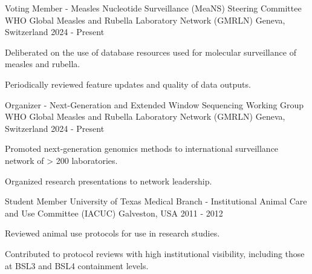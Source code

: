 

\begin{cventries}
  \vspace{-4.0mm}
  \cventry
    {Voting Member - Measles Nucleotide Surveillance (MeaNS) Steering Committee} %
    {WHO Global Measles and Rubella Laboratory Network (GMRLN)} %
    {Geneva, Switzerland} %
    {2024 - Present} %
    {
      \begin{cvitems} %
        \item {Deliberated on the use of database resources used for molecular surveillance of measles and rubella.}
        \item {Periodically reviewed feature updates and quality of data outputs.}
      \end{cvitems}
    } 
  \vspace{2.0mm}
  \cventry
    {Organizer - Next-Generation and Extended Window Sequencing Working Group} %
    {WHO Global Measles and Rubella Laboratory Network (GMRLN)} %
    {Geneva, Switzerland} %
    {2024 - Present} %
    {
      \begin{cvitems} %
        \item {Promoted next-generation genomics methods to international surveillance network of > 200 laboratories.}
        \item {Organized research presentations to network leadership.}
      \end{cvitems}
    } 
    
  \vspace{2.0mm}
  \cventry
    {Student Member} %
    {University of Texas Medical Branch - Institutional Animal Care and Use Committee (IACUC)} %
    {Galveston, USA} %
    {2011 - 2012} %
    {
     \begin{cvitems} %
        \item {Reviewed animal use protocols for use in research studies.}
        \item {Contributed to protocol reviews with high institutional visibility, including those at BSL3 and BSL4 containment levels.}
      \end{cvitems}
    }
\end{cventries}
